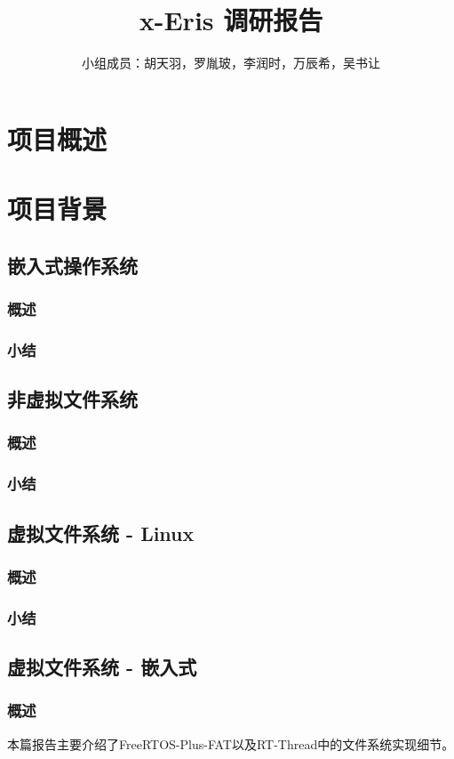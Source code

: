 \documentclass[a4paper]{article}
\title{x-Eris 调研报告}
\author{小组成员：胡天羽，罗胤玻，李润时，万辰希，吴书让}
\begin{document}
\maketitle

\section{项目概述}
\section{项目背景}
\subsection{嵌入式操作系统}
\subsubsection{概述}
\subsubsection{小结}

\subsection{非虚拟文件系统}
\subsubsection{概述}
\subsubsection{小结}

\subsection{虚拟文件系统 - Linux}
\subsubsection{概述}
\subsubsection{小结}

\subsection{虚拟文件系统 - 嵌入式}
\subsubsection{概述}
本篇报告主要介绍了FreeRTOS-Plus-FAT以及RT-Thread中的文件系统实现细节。
\end{document}
